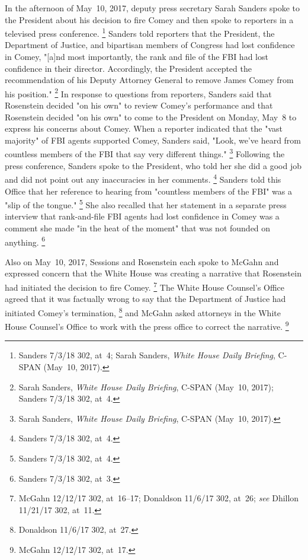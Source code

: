 In the afternoon of May~10, 2017, deputy press secretary Sarah Sanders spoke to the President about his decision to fire Comey and then spoke to reporters in a televised press conference.%
\footnote{Sanders 7/3/18 302, at~4;
Sarah Sanders, \textit{White House Daily Briefing}, C-SPAN (May~10, 2017).}
Sanders told reporters that the President, the Department of Justice, and bipartisan members of Congress had lost confidence in Comey, "[a]nd most importantly, the rank and file of the FBI had lost confidence in their director.
Accordingly, the President accepted the recommendation of his Deputy Attorney General to remove James Comey from his position."%
\footnote{Sarah Sanders, \textit{White House Daily Briefing}, C-SPAN (May~10, 2017);
Sanders 7/3/18 302, at~4.}
In response to questions from reporters, Sanders said that Rosenstein decided "on his own" to review Comey's performance and that Rosenstein decided "on his own" to come to the President on Monday, May~8 to express his concerns about Comey.
When a reporter indicated that the "vast majority" of FBI agents supported Comey, Sanders said, "Look, we've heard from countless members of the FBI that say very different things."%
\footnote{Sarah Sanders, \textit{White House Daily Briefing}, C-SPAN (May~10, 2017).}
Following the press conference, Sanders spoke to the President, who told her she did a good job and did not point out any inaccuracies in her comments.%
\footnote{Sanders 7/3/18 302, at~4.}
Sanders told this Office that her reference to hearing from "countless members of the FBI" was a "slip of the tongue."%
\footnote{Sanders 7/3/18 302, at~4.}
She also recalled that her statement in a separate press interview that rank-and-file FBI agents had lost confidence in Comey was a comment she made "in the heat of the moment" that was not founded on anything.%
\footnote{Sanders 7/3/18 302, at~3.}

Also on May~10, 2017, Sessions and Rosenstein each spoke to McGahn and expressed concern that the White House was creating a narrative that Rosenstein had initiated the decision to fire Comey.%
\footnote{McGahn 12/12/17 302, at~16--17;
Donaldson 11/6/17 302, at~26;
\textit{see} Dhillon 11/21/17 302, at~11.}
The White House Counsel's Office agreed that it was factually wrong to say that the Department of Justice had initiated Comey's termination,%
\footnote{Donaldson 11/6/17 302, at~27.}
and McGahn asked attorneys in the White House Counsel's Office to work with the press office to correct the narrative.%
\footnote{McGahn 12/12/17 302, at~17.}

